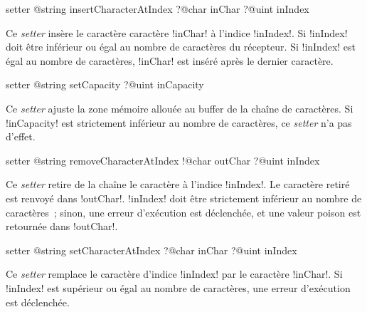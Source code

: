 
\begin{galgasbox}
setter @string insertCharacterAtIndex
   ?@char inChar
   ?@uint inIndex
\end{galgasbox}


Ce \emph{setter} insère le caractère caractère \ggs!inChar! à l'indice \ggs!inIndex!. Si \ggs!inIndex! doit être inférieur ou égal au nombre de caractères du récepteur. Si \ggs!inIndex! est égal au nombre de caractères, \ggs!inChar! est inséré après le dernier caractère. 









\begin{galgasbox}
setter @string setCapacity ?@uint inCapacity
\end{galgasbox}


Ce \emph{setter} ajuste la zone mémoire allouée au buffer de la chaîne de caractères. Si \ggs!inCapacity! est strictement inférieur au nombre de caractères, ce \emph{setter} n'a pas d'effet.







\begin{galgasbox}
setter @string removeCharacterAtIndex
   !@char outChar
   ?@uint inIndex
\end{galgasbox}


Ce \emph{setter} retire de la chaîne le caractère à l'indice \ggs!inIndex!. Le caractère retiré est renvoyé dans \ggs!outChar!. \ggs!inIndex! doit être strictement inférieur au nombre de caractères~; sinon, une erreur d'exécution est déclenchée, et une valeur poison est retournée dans \ggs!outChar!. 







\begin{galgasbox}
setter @string setCharacterAtIndex
   ?@char inChar
   ?@uint inIndex
\end{galgasbox}


Ce \emph{setter} remplace le caractère d'indice \ggs!inIndex! par le caractère \ggs!inChar!. Si \ggs!inIndex! est supérieur ou égal au nombre de caractères, une erreur d'exécution est déclenchée. 




